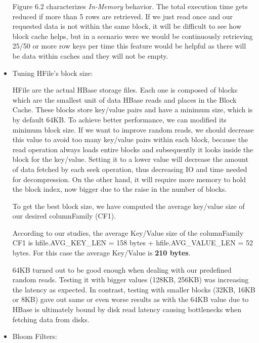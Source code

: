 \begin{itemize}
Figure 6.2 characterizes \textit{In-Memory} behavior. The total execution time gets reduced if more than 5 rows are retrieved. If we just read once and our requested data is not within the same block, it will be difficult to see how block cache helps, but in a scenario were we would be continuously retrieving 25/50 or more row keys per time this feature would be helpful as there will be data within caches and they will not be empty. 


\item Tuning HFile's block size:
\par
HFile are the actual HBase storage files. Each one is composed of blocks which are the smallest unit of data HBase reads and places in the Block Cache. These blocks store key/value pairs and have a minimum size, which is by default 64KB. To achieve better performance, we can modified its minimum block size. If we want to improve random reads, we should decrease this value to avoid too many key/value pairs within each block, because the read operation always loads entire blocks and subsequently it looks inside the block for the key/value. Setting it to a lower value will decrease the amount of data fetched by each seek operation, thus decreasing IO and time needed for decompression. On the other hand, it will require more memory to hold the block index, now bigger due to the raise in the number of blocks.

\bigskip

To get the best block size, we have computed the average key/value size of our desired columnFamily (CF1).
\par
According to our studies, the average Key/Value size of the columnFamily CF1 is hfile.AVG\_KEY\_LEN = 158 bytes + hfile.AVG\_VALUE\_LEN = 52 bytes. For this case the average Key/Value is \textbf{210 bytes}.
\par
64KB turned out to be good enough when dealing with our predefined random reads. Testing it with bigger values (128KB, 256KB) was increasing the latency as expected. In contrast, testing with smaller blocks (32KB, 16KB or 8KB) gave out same or even worse results as with the 64KB value due to HBase is ultimately bound by disk read latency causing bottlenecks when fetching data from disks.


\item Bloom Filters:


\end{itemize}
